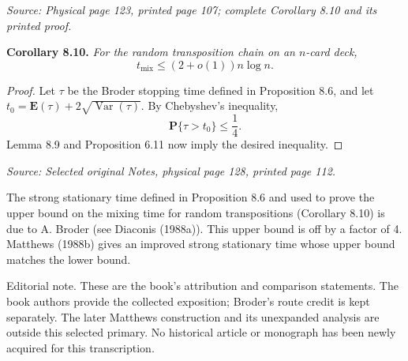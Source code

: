 \documentclass[11pt]{article}
\newcommand{\sourceloc}[1]{\par\smallskip\noindent\textit{Source: #1.}\par\nopagebreak[4]\smallskip}
\newcommand{\editorial}[1]{\par\smallskip\noindent\textsf{Editorial note.} #1\par\smallskip}
\begin{document}
\sourceloc{Physical page 123, printed page 107; complete Corollary 8.10 and its printed proof}
\noindent\textbf{Corollary 8.10.}
\emph{For the random transposition chain on an $n$-card deck,}
\[
t_{\mathrm{mix}}\le(2+o(1))n\log n.
\]
\begin{proof}
Let $\tau$ be the Broder stopping time defined in Proposition 8.6, and
let $t_0=\mathbf{E}(\tau)+2\sqrt{\operatorname{Var}(\tau)}$.
By Chebyshev's inequality,
\[
\mathbf{P}\{\tau>t_0\}\le\frac14.
\]
Lemma 8.9 and Proposition 6.11 now imply the desired inequality.
\end{proof}

\sourceloc{Selected original Notes, physical page 128, printed page 112}
The strong stationary time defined in Proposition 8.6 and used to
prove the upper bound on the mixing time for random transpositions
(Corollary 8.10) is due to A. Broder (see Diaconis (1988a)). This upper
bound is off by a factor of 4. Matthews (1988b) gives an improved
strong stationary time whose upper bound matches the lower bound.

\editorial{These are the book's attribution and comparison statements.
The book authors provide the collected exposition; Broder's route
credit is kept separately. The later Matthews construction and its
unexpanded analysis are outside this selected primary. No historical
article or monograph has been newly acquired for this transcription.}
\end{document}
